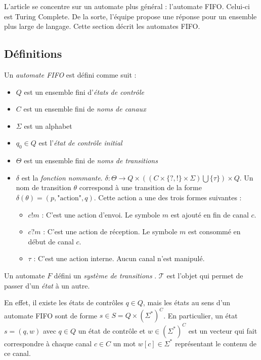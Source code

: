 L'article \cite{Vardhan04} se concentre sur un automate plus général : l'automate FIFO. Celui-ci est Turing Complete. De la sorte, l'équipe propose une réponse pour un ensemble plus large de langage. Cette section décrit les automates FIFO.




\subsection{Définitions}\label{ss:fifodef}

\begin{definition}
  Un \emph{automate FIFO} \fifo est défini comme suit :
  \begin{itemize}
    \item $Q$ est un ensemble fini d'\emph{états de contrôle}
    \item $C$ est un ensemble fini de \emph{noms de canaux}
    \item $\Sigma$ est un alphabet
    \item $q_0 \in Q$ est l'\emph{état de contrôle initial}
    \item $\Theta$ est un ensemble fini de \emph{noms de transitions}
    \item $\delta$ est la \emph{fonction nommante}. $\delta : \Theta \rightarrow Q \times ((C \times \{?,!\} \times \Sigma) \bigcup \{\tau\}) \times Q$. Un nom de transition $\theta$ correspond à une transition de la forme $\delta(\theta)=(p,\text{"action"},q)$. Cette action a une des trois formes suivantes :
    \begin{itemize}
      \item $c!m$ : C'est une action d'envoi. Le symbole $m$ est ajouté en fin de canal $c$.
      \item $c?m$ : C'est une action de réception. Le symbole $m$ est consommé en début de canal $c$.
      \item $\tau$ : C'est une action interne. Aucun canal n'est manipulé.
    \end{itemize}
  \end{itemize}
\end{definition}

Un automate $F$ défini un \emph{système de transitions} \tsys. $\mathcal{T}$ est l'objet qui permet de passer d'un \emph{état} à un autre.

En effet, il existe les états de contrôles $q\in Q$, mais les états au sens d'un automate FIFO sont de forme $s \in S=Q\times(\Sigma^*)^C$. En particulier, un état $s=(q,w)$ avec $q\in Q$ un état de contrôle et $w\in (\Sigma^*)^C$ est un vecteur qui fait correspondre à chaque canal $c\in C$ un mot $w[c] \in \Sigma^*$ représentant le contenu de ce canal.

